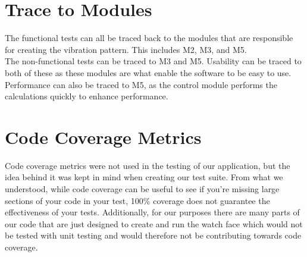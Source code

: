 \documentclass[12pt, titlepage]{article}
\begin{document}
\section{Trace to Modules}	
The functional tests can all be traced back to the modules that are responsible for creating the vibration pattern. This includes M2, M3, and M5.\\
\newline
\noindent
The non-functional tests can be traced to M3 and M5. Usability can be traced to both of these as these modules are what enable the software to be easy to use. Performance can also be traced to M5, as the control module performs the calculations quickly to enhance performance.

\section{Code Coverage Metrics}
Code coverage metrics were not used in the testing of our application, but the idea behind it was kept in mind when creating our test suite. From what we understood, while code coverage can be useful to see if you're missing large sections of your code in your test, 100\% coverage does not guarantee the effectiveness of your tests. Additionally, for our purposes there are many parts of our code that are just designed to create and run the watch face which would not be tested with unit testing and would therefore not be contributing towards code coverage.




\end{document}
